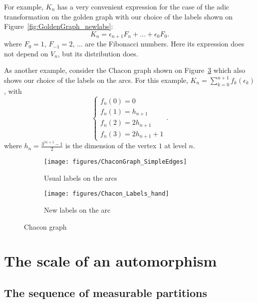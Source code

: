 \documentclass[12pt,a4paper]{article}
\begin{document}
For example, $K_n$ has a very convenient expression for the case of the adic 
transformation on the golden graph with our choice of the labels shown on 
Figure~\ref{fig:GoldenGraph_newlabs}:
$$
K_n = \epsilon_{n+1}F_{n} + \ldots + \epsilon_0F_0.   
$$
where $F_0=1$, $F_{-1}=2$,  $\ldots$ are the Fibonacci numbers.  
Here its expression does not depend on $V_n$, but its distribution does. 

As another example, consider the Chacon graph shown on Figure~\ref{fig:ChaconGraph} 
which also shows our choice of the labels on the arcs. 
For this example, 
$K_n=\sum_{k=0}^{n+1}f_k(\epsilon_k)$, with  
$$
\begin{cases}
f_n(0) = 0 \\ 
f_n(1) = h_{n+1} \\ 
f_n(2) = 2h_{n+1} \\
f_n(3) = 2 h_{n+1} + 1
\end{cases}.
$$
where $h_n=\frac{3^{|n|+1}-1}{2}$ is the dimension of the vertex $1$ at level $n$. 

\begin{figure}[!h]
   \centering
   \begin{subfigure}[t]{0.47\textwidth}
   \centering
   	\texttt{[image: figures/ChaconGraph\_SimpleEdges]}
 		\caption{\footnotesize Usual labels on the arcs}\label{fig:ChaconGraph_simpleedges}
    \end{subfigure}              
   \quad
    \begin{subfigure}[t]{0.47\textwidth}
    \centering
   	\texttt{[image: figures/Chacon\_Labels\_hand]}
 		\caption{\footnotesize New labels on the arc}\label{fig:ChaconGraph_newlabs}
 	\end{subfigure}      

   \caption{Chacon graph}
   \label{fig:ChaconGraph}
 \end{figure}



\section{The scale of an automorphism}

\subsection{The sequence of measurable partitions}
\end{document}
